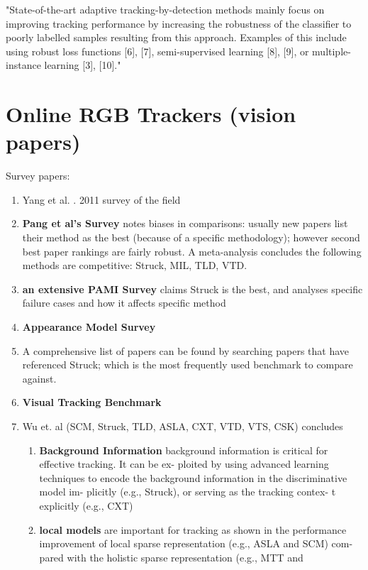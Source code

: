 "State-of-the-art adaptive tracking-by-detection methods mainly
focus on improving tracking performance by increasing
the robustness of the classifier to poorly labelled samples
resulting from this approach. Examples of this include using
robust loss functions [6], [7], semi-supervised learning [8],
[9], or multiple-instance learning [3], [10]." \cite{hare2014struck}


\section{Online RGB Trackers (vision papers)}
Survey papers:
\begin{enumerate}
\item Yang et al. \cite{yang2011recent}. 2011 survey of the field
\item \textbf{Pang et al's Survey} \cite{pang2013finding} notes biases in
comparisons: usually new papers list their method as the best (because of a
specific methodology); however second best paper rankings are fairly robust. A
meta-analysis concludes the following methods are competitive: Struck, MIL, TLD,
VTD. 
\item \textbf{an extensive PAMI Survey} \cite{smeulders2013visual} claims Struck
is the best, and analyses specific failure cases and how it affects specific
method
\item \textbf{Appearance Model Survey} \cite{li2013survey}
\item A comprehensive list of papers can be found by searching papers that have
referenced Struck; which is the most frequently used benchmark to compare
against.
\item \textbf{Visual Tracking Benchmark}\cite{kristan2013visual} 
\item Wu et. al \cite{wu2013online} (SCM, Struck, TLD, ASLA, CXT, VTD, VTS, CSK)
concludes
    \begin{enumerate}
    \item \textbf{Background Information}  background
    information is critical for effective tracking. It can be ex-
    ploited by using advanced learning techniques to encode
    the background information in the discriminative model im-
    plicitly (e.g., Struck), or serving as the tracking contex-
    t explicitly (e.g., CXT)
    \item \textbf{local models}  are important for tracking as shown in the performance improvement of local sparse representation (e.g., ASLA and SCM) com-
    pared with the holistic sparse representation (e.g., MTT and

\end{enumerate}
\end{enumerate}
